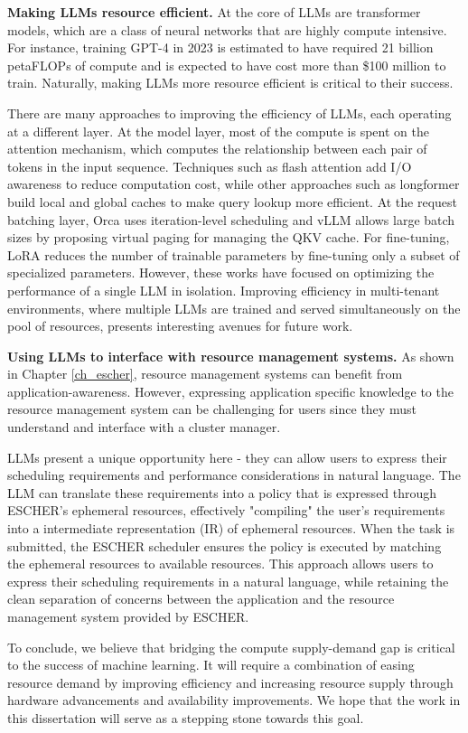 \textbf{Making LLMs resource efficient.} At the core of LLMs are transformer models, which are a class of neural networks that are highly compute intensive. For instance, training GPT-4\cite{openai2023gpt4} in 2023 is estimated to have required 21 billion petaFLOPs\cite{mlmodelflops} of compute and is expected to have cost more than \$100 million to train. Naturally, making LLMs more resource efficient is critical to their success.

There are many approaches to improving the efficiency of LLMs, each operating at a different layer. At the model layer, most of the compute is spent on the attention mechanism, which computes the relationship between each pair of tokens in the input sequence. Techniques such as flash attention\cite{dao2022flashattention} add I/O awareness to reduce computation cost, while other approaches such as longformer\cite{beltagy2020longformer} build local and global caches to make query lookup more efficient. At the request batching layer, Orca\cite{orca} uses iteration-level scheduling and vLLM \cite{kwon2023efficient} allows large batch sizes by proposing virtual paging for managing the QKV cache. For fine-tuning, LoRA\cite{hu2022lora} reduces the number of trainable parameters by fine-tuning only a subset of specialized parameters. However, these works have focused on optimizing the performance of a single LLM in isolation. Improving efficiency in multi-tenant environments, where multiple LLMs are trained and served simultaneously on the pool of resources, presents interesting avenues for future work.

\textbf{Using LLMs to interface with resource management systems.} As shown in Chapter \ref{ch_escher}, resource management systems can benefit from application-awareness. However, expressing application specific knowledge to the resource management system can be challenging for users since they must understand and interface with a cluster manager.

LLMs present a unique opportunity here - they can allow users to express their scheduling requirements and performance considerations in natural language. The LLM can translate these requirements into a policy that is expressed through ESCHER's ephemeral resources, effectively "compiling" the user's requirements into a intermediate representation (IR) of ephemeral resources. When the task is submitted, the ESCHER scheduler ensures the policy is executed by matching the ephemeral resources to available resources. This approach allows users to express their scheduling requirements in a natural language, while retaining the clean separation of concerns between the application and the resource management system provided by ESCHER.

To conclude, we believe that bridging the compute supply-demand gap is critical to the success of machine learning. It will require a combination of easing resource demand by improving efficiency and increasing resource supply through hardware advancements and availability improvements. We hope that the work in this dissertation will serve as a stepping stone towards this goal.
